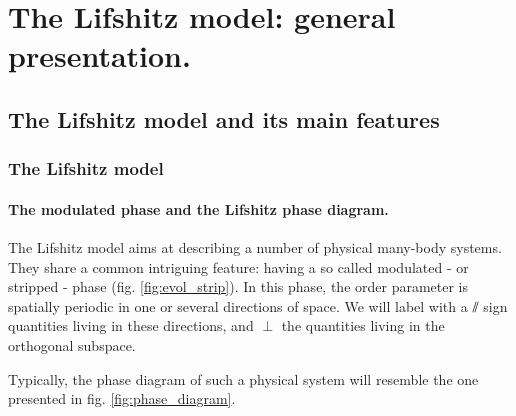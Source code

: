 
\chapter{The Lifshitz model: general presentation.}

\section{The Lifshitz model and its main features}

\subsection{The Lifshitz model}

\subsubsection{The modulated phase and the Lifshitz phase diagram.}

The Lifshitz model aims at describing a number of physical many-body systems. They share a common intriguing feature: having a so called modulated - or stripped - phase (fig. \eqref{fig:evol_strip}). In this phase, the order parameter is spatially periodic in one or several directions of space. We will label with a $\sslash$ sign quantities living in these directions, and $\perp$ the quantities living in the orthogonal subspace.

Typically, the phase diagram of such a physical system will resemble the one presented in fig. \eqref{fig:phase_diagram}.

